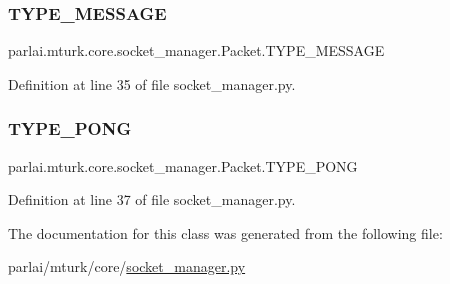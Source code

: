 \subsubsection{\texorpdfstring{T\+Y\+P\+E\+\_\+\+M\+E\+S\+S\+A\+GE}{TYPE\_MESSAGE}}
{\footnotesize\ttfamily parlai.\+mturk.\+core.\+socket\+\_\+manager.\+Packet.\+T\+Y\+P\+E\+\_\+\+M\+E\+S\+S\+A\+GE\hspace{0.3cm}{\ttfamily [static]}}



Definition at line 35 of file socket\+\_\+manager.\+py.

\mbox{\label{classparlai_1_1mturk_1_1core_1_1socket__manager_1_1Packet_ab226c447695e66b324b03b6efa83be3d}} 
\subsubsection{\texorpdfstring{T\+Y\+P\+E\+\_\+\+P\+O\+NG}{TYPE\_PONG}}
{\footnotesize\ttfamily parlai.\+mturk.\+core.\+socket\+\_\+manager.\+Packet.\+T\+Y\+P\+E\+\_\+\+P\+O\+NG\hspace{0.3cm}{\ttfamily [static]}}



Definition at line 37 of file socket\+\_\+manager.\+py.



The documentation for this class was generated from the following file\+:\begin{DoxyCompactItemize}
\item 
parlai/mturk/core/\hyperlink{socket__manager_8py}{socket\+\_\+manager.\+py}\end{DoxyCompactItemize}
